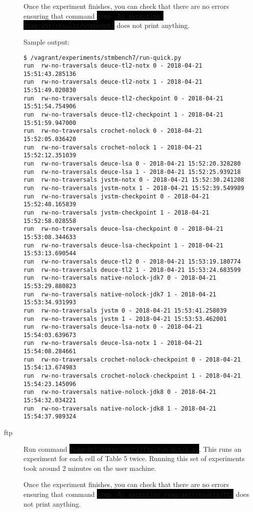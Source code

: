 \documentclass[12pt]{article}
\newcommand{\command}[1]{\colorbox{black}{\texttt{\color{white}#1}}}
\begin{document}
\begin{description}
        Once the experiment finishes, you can check that there are no errors
        ensuring that command \command{grep -Ri exception /vagrant/results/stmbench7}
        does not print anything.

Sample output:
\begin{verbatim}
$ /vagrant/experiments/stmbench7/run-quick.py
run  rw-no-traversals deuce-tl2-notx 0 - 2018-04-21 15:51:43.285136
run  rw-no-traversals deuce-tl2-notx 1 - 2018-04-21 15:51:49.020830
run  rw-no-traversals deuce-tl2-checkpoint 0 - 2018-04-21 15:51:54.754906
run  rw-no-traversals deuce-tl2-checkpoint 1 - 2018-04-21 15:51:59.947000
run  rw-no-traversals crochet-nolock 0 - 2018-04-21 15:52:05.036420
run  rw-no-traversals crochet-nolock 1 - 2018-04-21 15:52:12.351039
run  rw-no-traversals deuce-lsa 0 - 2018-04-21 15:52:20.328280
run  rw-no-traversals deuce-lsa 1 - 2018-04-21 15:52:25.939218
run  rw-no-traversals jvstm-notx 0 - 2018-04-21 15:52:30.241208
run  rw-no-traversals jvstm-notx 1 - 2018-04-21 15:52:39.549989
run  rw-no-traversals jvstm-checkpoint 0 - 2018-04-21 15:52:48.165839
run  rw-no-traversals jvstm-checkpoint 1 - 2018-04-21 15:52:58.028558
run  rw-no-traversals deuce-lsa-checkpoint 0 - 2018-04-21 15:53:08.344633
run  rw-no-traversals deuce-lsa-checkpoint 1 - 2018-04-21 15:53:13.690544
run  rw-no-traversals deuce-tl2 0 - 2018-04-21 15:53:19.180774
run  rw-no-traversals deuce-tl2 1 - 2018-04-21 15:53:24.683599
run  rw-no-traversals native-nolock-jdk7 0 - 2018-04-21 15:53:29.880823
run  rw-no-traversals native-nolock-jdk7 1 - 2018-04-21 15:53:34.931993
run  rw-no-traversals jvstm 0 - 2018-04-21 15:53:41.258039
run  rw-no-traversals jvstm 1 - 2018-04-21 15:53:53.462001
run  rw-no-traversals deuce-lsa-notx 0 - 2018-04-21 15:54:03.639673
run  rw-no-traversals deuce-lsa-notx 1 - 2018-04-21 15:54:08.284661
run  rw-no-traversals crochet-nolock-checkpoint 0 - 2018-04-21 15:54:13.674983
run  rw-no-traversals crochet-nolock-checkpoint 1 - 2018-04-21 15:54:23.145096
run  rw-no-traversals native-nolock-jdk8 0 - 2018-04-21 15:54:32.034221
run  rw-no-traversals native-nolock-jdk8 1 - 2018-04-21 15:54:37.989324
\end{verbatim}

    \item[ftp] Run command
        \command{/vagrant/experiments/ftp/run-quick.py}.  This runs an
        experiment for each cell of Table 5 twice.  Running this set of
        experiments took around 2 minutes on the user machine.

        Once the experiment finishes, you can check that there are no errors
        ensuring that command \command{grep -Ri exception /vagrant/results/ftp}
        does not print anything.
        

\end{description}
\end{document}
